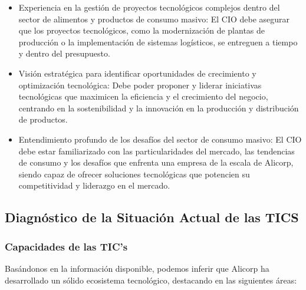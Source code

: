 \begin{itemize}
            \item Experiencia en la gestión de proyectos tecnológicos complejos dentro del sector de alimentos y productos de consumo masivo: El CIO debe asegurar que los proyectos tecnológicos, como la modernización de plantas de producción o la implementación de sistemas logísticos, se entreguen a tiempo y dentro del presupuesto. 
            \item Visión estratégica para identificar oportunidades de crecimiento y optimización tecnológica: Debe poder proponer y liderar iniciativas tecnológicas que maximicen la eficiencia y el crecimiento del negocio, centrando en la sostenibilidad y la innovación en la producción y distribución de productos. 
            \item Entendimiento profundo de los desafíos del sector de consumo masivo: El CIO debe estar familiarizado con las particularidades del mercado, las tendencias de consumo y los desafíos que enfrenta una empresa de la escala de Alicorp, siendo capaz de ofrecer soluciones tecnológicas que potencien su competitividad y liderazgo en el mercado. 
        \end{itemize}


\subsection{Diagnóstico de la Situación Actual de las TICS}
    \subsubsection{Capacidades de las TIC’s }
    Basándonos en la información disponible, podemos inferir que Alicorp ha desarrollado un sólido ecosistema tecnológico, destacando en las siguientes áreas: 

